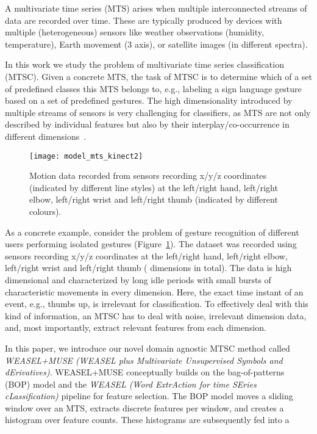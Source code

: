 \documentclass[sigconf]{acmart}
\begin{document}
A multivariate time series (MTS) arises when multiple interconnected streams of data are recorded over time. These are typically produced by devices with multiple (heterogeneous) sensors like weather observations (humidity, temperature), Earth movement (3 axis), or satellite images (in different spectra).

In this work we study the problem of multivariate time series classification (MTSC).  Given a concrete MTS, the task of MTSC is to determine which of a set of predefined classes this MTS belongs to, e.g., labeling a sign language gesture based on a set of predefined gestures. The high dimensionality introduced by multiple streams of sensors is very challenging for classifiers, as MTS are not only described by individual features but also by their interplay/co-occurrence in different dimensions~\cite{baydogan2015learning}.

\begin{figure}
	\begin{centering}
		\texttt{[image: model\_mts\_kinect2]}
		\par\end{centering}
	\caption{Motion data recorded from  sensors recording x/y/z coordinates (indicated by different line styles) at the left/right hand, left/right elbow, left/right wrist and left/right thumb (indicated by different colours).\label{fig:model_mts_kinect}}
\end{figure}

As a concrete example, consider the problem of gesture recognition of different users performing isolated gestures (Figure~\ref{fig:model_mts_kinect}). The dataset was recorded using  sensors recording x/y/z coordinates at the left/right hand, left/right elbow, left/right wrist and left/right thumb ( dimensions in total). The data is high dimensional and characterized by long idle periods with small bursts of characteristic movements in every dimension. Here, the exact time instant of an event, e.g., thumbs up, is irrelevant for classification. To effectively deal with this kind of information, an MTSC has to deal with noise, irrelevant dimension data, and, most importantly, extract relevant features from each dimension.

In this paper, we introduce our novel domain agnostic MTSC method called \emph{WEASEL+MUSE (WEASEL plus Multivariate Unsupervised Symbols and dErivatives)}. WEASEL+MUSE conceptually builds on the bag-of-patterns (BOP) model and the \emph{WEASEL (Word ExtrAction for time SEries cLassification)} pipeline for feature selection. The BOP model moves a sliding window over an MTS, extracts discrete features per window, and creates a histogram over feature counts. These histograms are subsequently fed into a machine learning classifier. However, the concrete way of constructing and filtering features in WEASEL+MUSE is different from state-of-the-art multivariate classifiers:
\end{document}
